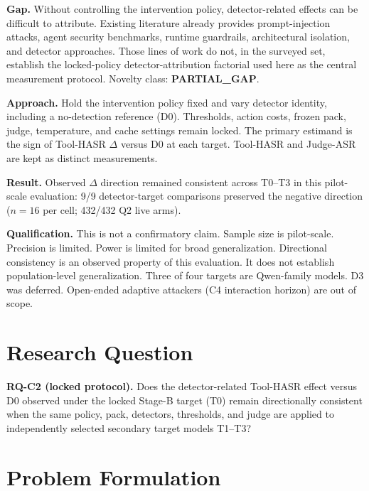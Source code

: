 \documentclass[conference]{IEEEtran}
\begin{document}
\textbf{Gap.} Without controlling the intervention policy, detector-related effects can be difficult to attribute. Existing literature already provides prompt-injection attacks, agent security benchmarks, runtime guardrails, architectural isolation, and detector approaches. Those lines of work do not, in the surveyed set, establish the locked-policy detector-attribution factorial used here as the central measurement protocol. Novelty class: \textbf{PARTIAL\_GAP}.

\textbf{Approach.} Hold the intervention policy fixed and vary detector identity, including a no-detection reference (D0). Thresholds, action costs, frozen pack, judge, temperature, and cache settings remain locked. The primary estimand is the sign of Tool-HASR $\Delta$ versus D0 at each target. Tool-HASR and Judge-ASR are kept as distinct measurements.

\textbf{Result.} Observed $\Delta$ direction remained consistent across T0--T3 in this pilot-scale evaluation: 9/9 detector-target comparisons preserved the negative direction ($n=16$ per cell; 432/432 Q2 live arms).

\textbf{Qualification.} This is not a confirmatory claim. Sample size is pilot-scale. Precision is limited. Power is limited for broad generalization. Directional consistency is an observed property of this evaluation. It does not establish population-level generalization. Three of four targets are Qwen-family models. D3 was deferred. Open-ended adaptive attackers (C4 interaction horizon) are out of scope.

\section{Research Question}
\label{sec:rq}

\textbf{RQ-C2 (locked protocol).} Does the detector-related Tool-HASR effect versus D0 observed under the locked Stage-B target (T0) remain directionally consistent when the same policy, pack, detectors, thresholds, and judge are applied to independently selected secondary target models T1--T3?

\section{Problem Formulation}
\label{sec:formulation}
\end{document}
